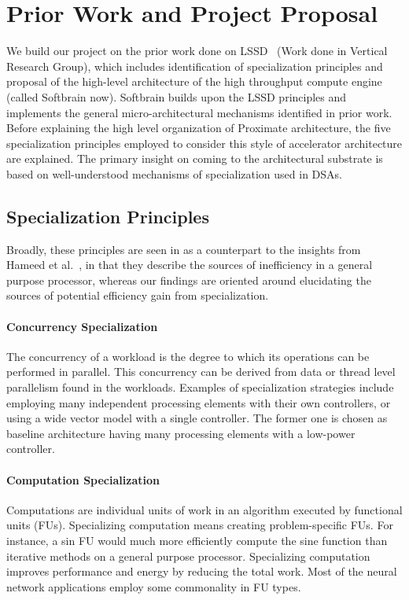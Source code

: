 \section{Prior Work and Project Proposal} \label{sec:prior}

We build our project on the prior work done on LSSD~\cite{nowatzki2016pushing} (Work done in Vertical Research Group), which includes identification of specialization principles and proposal of the
high-level architecture of the high throughput compute engine (called Softbrain now). Softbrain builds 
upon the LSSD principles and implements the general micro-architectural mechanisms identified in prior work. 
Before explaining the high level organization of Proximate architecture, the five
specialization principles employed to consider this style of accelerator architecture are explained. 
The primary insight 
on coming to the architectural substrate is based on well-understood mechanisms of specialization used in
DSAs. 

\subsection{Specialization Principles}
Broadly, these principles are seen in as a counterpart to the insights from Hameed et al.~\cite{1815968}, in that they describe the sources of inefficiency in a general purpose processor, whereas our findings are oriented around
elucidating the sources of potential efficiency gain from specialization.

\paragraph{Concurrency Specialization}
The concurrency of a workload is the degree to which its operations can be
performed in parallel. This concurrency can be derived from data or thread level parallelism found in the
workloads. Examples of specialization strategies include employing many independent processing elements
with their own controllers, or using a wide vector model with a single controller. The former one is chosen as
baseline architecture having many processing elements with a low-power controller.

\paragraph{Computation Specialization} Computations are individual units of work in an algorithm executed by
functional units (FUs). Specializing computation means creating problem-specific FUs. For instance, a sin
FU would much more efficiently compute the sine function than iterative methods on a general purpose
processor. Specializing computation improves performance and energy by reducing the total work. Most of
the neural network applications employ some commonality in FU types.

